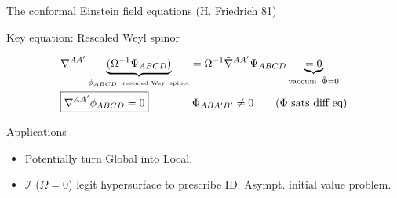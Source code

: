 \documentclass[10pt]{beamer}
\theoremstyle{plain}
\def\bma{{\bm a}}
\def\bmb{{\bm b}}
\def\bmc{{\bm c}}
\def\bme{{\bm e}}
\begin{document}
\begin{frame}{The conformal Einstein field equations (H. Friedrich 81)}
\begin{block}{Key equation: Rescaled Weyl spinor}
\begin{itemize}
\begin{align}
     & \nabla^{AA'} \underbrace{(\Omega^{-1}\Psi_{ABCD})}_{\phi_{ABCD}\;\;\text{\tiny{rescaled Weyl spinor}}}
      = \Omega^{-1}\tilde{\nabla}^{AA'}  \Psi_{ABCD}  \underbrace{=0}_{\text{vaccum}\;\; \tilde{\Phi}=0} \nonumber \\
    & \boxed{\nabla^{AA'}\phi_{ABCD}=0} \qquad \qquad \Phi_{ABA'B'} \neq 0 \qquad \text{($\Phi$ sats diff eq)} \nonumber 
    \end{align}
  \end{itemize}
\end{block}
\vspace{-5mm}
\begin{exampleblock}{Applications}
  \begin{itemize}
    \item Potentially turn Global into Local.
  \item $\mathscr{I}$ ($\Omega=0$) legit hypersurface to prescribe ID: Asympt. initial value problem. 
    \end{itemize}
  \end{exampleblock}
\end{frame}
\end{document}
